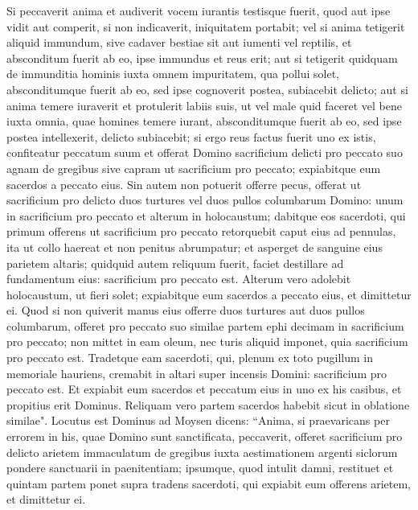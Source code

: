 \begin{biblechapter}  
\verse Si peccaverit anima et audiverit vocem iurantis testisque fuerit, quod aut ipse vidit aut comperit, si non indicaverit, iniquitatem portabit; 
\verse vel si anima tetigerit aliquid immundum, sive cadaver bestiae sit aut iumenti vel reptilis, et absconditum fuerit ab eo, ipse immundus et reus erit; 
\verse aut si tetigerit quidquam de immunditia hominis iuxta omnem impuritatem, qua pollui solet, absconditumque fuerit ab eo, sed ipse cognoverit postea, subiacebit delicto; 
\verse aut si anima temere iuraverit et protulerit labiis suis, ut vel male quid faceret vel bene iuxta omnia, quae homines temere iurant, absconditumque fuerit ab eo, sed ipse postea intellexerit, delicto subiacebit;  
\verse si ergo reus factus fuerit uno ex istis, confiteatur peccatum suum 
\verse et offerat Domino sacrificium delicti pro peccato suo agnam de gregibus sive capram ut sacrificium pro peccato; expiabitque eum sacerdos a peccato eius. 
\verse Sin autem non potuerit offerre pecus, offerat ut sacrificium pro delicto duos turtures vel duos pullos columbarum Domino: unum in sacrificium pro peccato et alterum in holocaustum; 
\verse dabitque eos sacerdoti, qui primum offerens ut sacrificium pro peccato retorquebit caput eius ad pennulas, ita ut collo haereat et non penitus abrumpatur; 
\verse et asperget de sanguine eius parietem altaris; quidquid autem reliquum fuerit, faciet destillare ad fundamentum eius: sacrificium pro peccato est. 
\verse Alterum vero adolebit holocaustum, ut fieri solet; expiabitque eum sacerdos a peccato eius, et dimittetur ei. 
\verse Quod si non quiverit manus eius offerre duos turtures aut duos pullos columbarum, offeret pro peccato suo similae partem ephi decimam in sacrificium pro peccato; non mittet in eam oleum, nec turis aliquid imponet, quia sacrificium pro peccato est. 
\verse Tradetque eam sacerdoti, qui, plenum ex toto pugillum in memoriale hauriens, cremabit in altari super incensis Domini: sacrificium pro peccato est. 
\verse Et expiabit eum sacerdos et peccatum eius in uno ex his casibus, et propitius erit Dominus. Reliquam vero partem sacerdos habebit sicut in oblatione similae". 
\verse Locutus est Dominus ad Moysen dicens: 
\verse “Anima, si praevaricans per errorem in his, quae Domino sunt sanctificata, peccaverit, offeret sacrificium pro delicto arietem immaculatum de gregibus iuxta aestimationem argenti siclorum pondere sanctuarii in paenitentiam; 
\verse ipsumque, quod intulit damni, restituet et quintam partem ponet supra tradens sacerdoti, qui expiabit eum offerens arietem, et dimittetur ei. 

\end{biblechapter}
